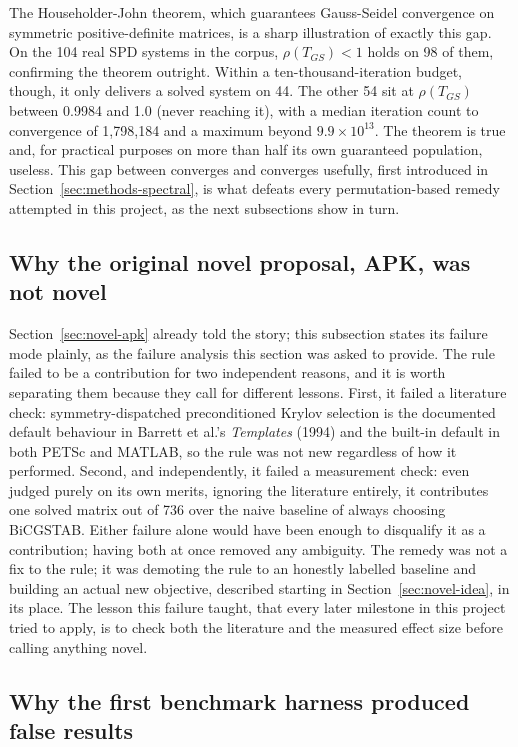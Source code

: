 \documentclass[11pt,a4paper]{article}
\begin{document}
The Householder-John theorem, which guarantees Gauss-Seidel convergence on symmetric
positive-definite matrices, is a sharp illustration of exactly this gap. On the 104 real
SPD systems in the corpus, $\rho(T_{GS}) < 1$ holds on 98 of them, confirming the theorem
outright. Within a ten-thousand-iteration budget, though, it only delivers a solved system
on 44. The other 54 sit at $\rho(T_{GS})$ between 0.9984 and 1.0 (never reaching it), with
a median iteration count to convergence of 1{,}798{,}184 and a maximum beyond
$9.9\times10^{13}$. The theorem is true and, for practical purposes on more than half its
own guaranteed population, useless. This gap between converges and converges usefully,
first introduced in Section~\ref{sec:methods-spectral}, is what defeats every
permutation-based remedy attempted in this project, as the next subsections show in turn.

\subsection{Why the original novel proposal, APK, was not novel}
\label{sec:failure-apk}

Section~\ref{sec:novel-apk} already told the story; this subsection states its failure
mode plainly, as the failure analysis this section was asked to provide. The rule failed
to be a contribution for two independent reasons, and it is worth separating them because
they call for different lessons. First, it failed a literature check: symmetry-dispatched
preconditioned Krylov selection is the documented default behaviour in Barrett et al.'s
\emph{Templates} (1994) and the built-in default in both PETSc and MATLAB, so the rule was
not new regardless of how it performed. Second, and independently, it failed a measurement
check: even judged purely on its own merits, ignoring the literature entirely, it
contributes one solved matrix out of 736 over the naive baseline of always choosing
BiCGSTAB. Either failure alone would have been enough to disqualify it as a contribution;
having both at once removed any ambiguity. The remedy was not a fix to the rule; it was
demoting the rule to an honestly labelled baseline and building an actual new objective,
described starting in Section~\ref{sec:novel-idea}, in its place. The lesson this failure
taught, that every later milestone in this project tried to apply, is to check both the
literature and the measured effect size before calling anything novel.

\subsection{Why the first benchmark harness produced false results}
\label{sec:failure-mistakes}
\end{document}
